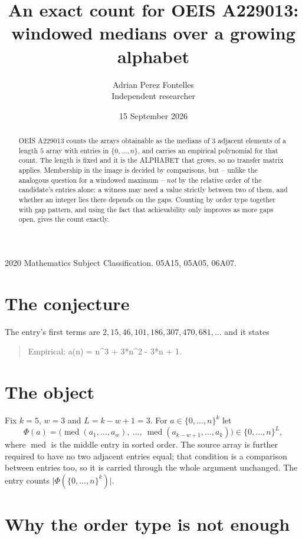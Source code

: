 \documentclass[11pt,a4paper]{article}
\title{An exact count for OEIS A229013: windowed medians over a growing alphabet}
\author{Adrian Perez Fontelles\\ \small Independent researcher}
\date{15 September 2026}
\theoremstyle{plain}
\theoremstyle{definition}
\begin{document}
\maketitle

\begin{abstract}
OEIS A229013 counts the arrays obtainable as the medians of $3$ adjacent elements of a length
$5$ array with entries in $\{0,\dots,n\}$, and carries an empirical polynomial for that
count. The length is fixed and it is the ALPHABET that grows, so no transfer matrix applies.
Membership in the image is decided by comparisons, but -- unlike the analogous question for a
windowed maximum -- \emph{not} by the relative order of the candidate's entries alone: a
witness may need a value strictly between two of them, and whether an integer lies there depends
on the gaps. Counting by order type together with gap pattern, and using the fact that
achievability only improves as more gaps open, gives the count exactly.
\end{abstract}

\noindent\small 2020 Mathematics Subject Classification. 05A15, 05A05, 06A07.\normalsize

\section{The conjecture}

The entry's first terms are $2, 15, 46, 101, 186, 307, 470, 681,\dots$ and it states

\begin{quote}\raggedright Empirical: a(n) = n\^{}3 + 3*n\^{}2 - 3*n + 1.\end{quote}

\section{The object}

Fix $k=5$, $w=3$ and $L=k-w+1=3$. For $a\in\{0,\dots,n\}^k$ let
\[
  \Phi(a)=\bigl(\operatorname{med}(a_1,\dots,a_w),\ \dots,\
  \operatorname{med}(a_{k-w+1},\dots,a_k)\bigr)\in\{0,\dots,n\}^{L} ,
\]
where $\operatorname{med}$ is the middle entry in sorted order. The source array is further required to have no two adjacent entries equal; that condition is a comparison between entries too, so it is carried through the whole argument unchanged. The entry counts
$\lvert\Phi(\{0,\dots,n\}^k)\rvert$.

\section{Why the order type is not enough}
\end{document}
